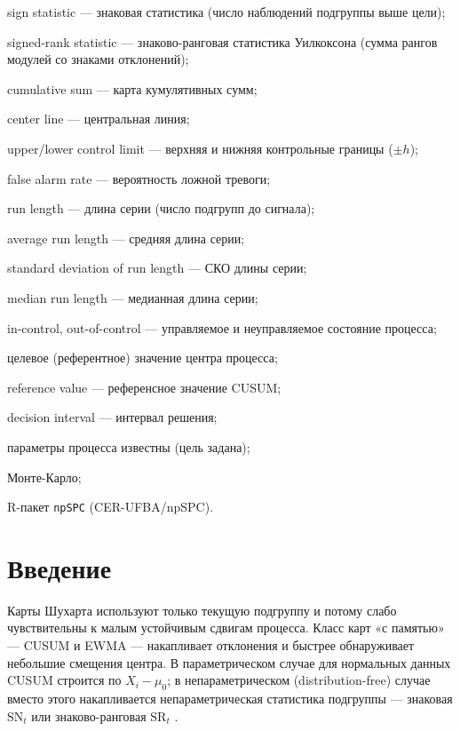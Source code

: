 \documentclass[11pt,a4paper]{article}
\newcommand{\SN}{\mathrm{SN}}
\newcommand{\SR}{\mathrm{SR}}
\begin{document}
\begin{description}[leftmargin=2.8cm,itemsep=1pt]
  \item[SN] sign statistic --- знаковая статистика (число наблюдений
        подгруппы выше цели);
  \item[SR] signed-rank statistic --- знаково-ранговая статистика
        Уилкоксона (сумма рангов модулей со знаками отклонений);
  \item[CUSUM] cumulative sum --- карта кумулятивных сумм;
  \item[CL] center line --- центральная линия;
  \item[UCL, LCL] upper/lower control limit --- верхняя и нижняя
        контрольные границы ($\pm h$);
  \item[FAR] false alarm rate --- вероятность ложной тревоги;
  \item[RL] run length --- длина серии (число подгрупп до сигнала);
  \item[ARL] average run length --- средняя длина серии;
  \item[SDRL] standard deviation of run length --- СКО длины серии;
  \item[MRL] median run length --- медианная длина серии;
  \item[IC, OOC] in-control, out-of-control --- управляемое и
        неуправляемое состояние процесса;
  \item[$\mu_0$] целевое (референтное) значение центра процесса;
  \item[$k$] reference value --- референсное значение CUSUM;
  \item[$h$] decision interval --- интервал решения;
  \item[Case K] параметры процесса известны (цель задана);
  \item[МК] Монте-Карло;
  \item[npSPC] R-пакет \texttt{npSPC} (CER-UFBA/npSPC).
\end{description}

\section{Введение}
\label{sec:intro}

Карты Шухарта используют только текущую подгруппу и потому слабо
чувствительны к малым устойчивым сдвигам процесса. Класс карт «с памятью»
--- CUSUM и EWMA --- накапливает отклонения и быстрее обнаруживает
небольшие смещения центра. В параметрическом случае для нормальных данных
CUSUM строится по $X_i-\mu_0$; в непараметрическом (distribution-free)
случае вместо этого накапливается непараметрическая статистика подгруппы
--- знаковая $\SN_t$ или знаково-ранговая $\SR_t$
\cite[\S4.2.2, стр.~202--208]{Chakraborti2019}.
\end{document}
